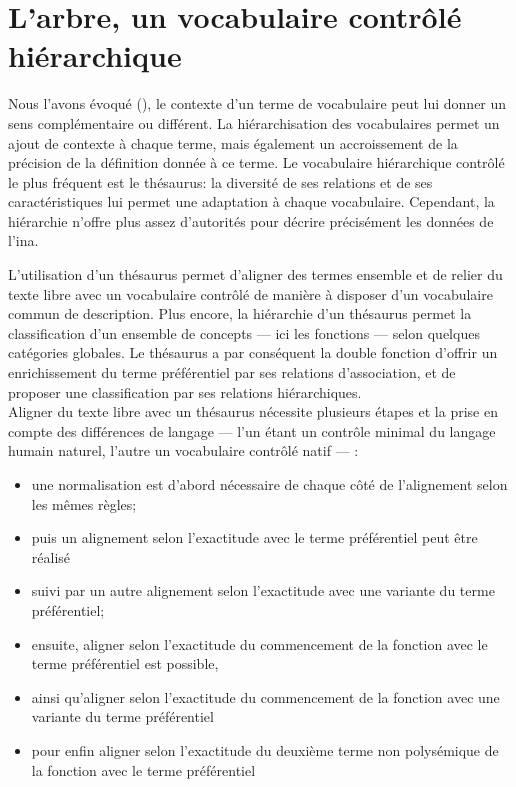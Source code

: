 \chapter{\label{I-C}L'arbre, un vocabulaire contrôlé hiérarchique}

Nous l'avons évoqué (), le contexte d'un terme de vocabulaire peut lui donner un sens complémentaire ou différent. La hiérarchisation des vocabulaires permet un ajout de contexte à chaque terme, mais également un accroissement de la précision de la définition donnée à ce terme. Le vocabulaire hiérarchique contrôlé le plus fréquent est le thésaurus: la diversité de ses relations et de ses caractéristiques lui permet une adaptation à chaque vocabulaire. Cependant, la hiérarchie n'offre plus assez d'autorités pour décrire précisément les données de l'\ac{ina}.








\bigskip
\bigskip
\bigskip
L'utilisation d'un thésaurus permet d'aligner des termes ensemble et de relier du texte libre avec un vocabulaire contrôlé de manière à disposer d'un vocabulaire commun de description. Plus encore, la hiérarchie d'un thésaurus permet la classification d'un ensemble de concepts --- ici les fonctions --- selon quelques catégories globales. Le thésaurus a par conséquent la double fonction d'offrir un enrichissement du terme préférentiel par ses relations d'association, et de proposer une classification par ses relations hiérarchiques.\\

Aligner du texte libre avec un thésaurus nécessite plusieurs étapes et la prise en compte des différences de langage --- l'un étant un contrôle minimal du langage humain naturel, l'autre un vocabulaire contrôlé natif --- :
\begin{itemize}
	\item une normalisation est d'abord nécessaire de chaque côté de l'alignement selon les mêmes règles;
	\item puis un alignement selon l'exactitude avec le terme préférentiel peut être réalisé
	\item suivi par un autre alignement selon l'exactitude avec une variante du terme préférentiel;
	\item ensuite, aligner selon l'exactitude du commencement de la fonction avec le terme préférentiel est possible, 
	\item ainsi qu'aligner selon l'exactitude du commencement de la fonction avec une variante du terme préférentiel
	\item pour enfin aligner selon l'exactitude du deuxième terme non polysémique de la fonction avec le terme préférentiel
\end{itemize}

